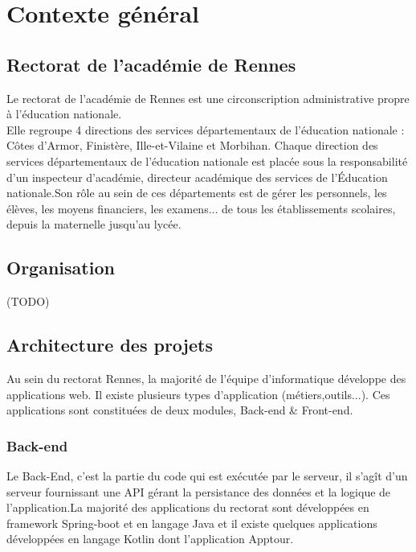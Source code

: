 \documentclass[12pt]{article}
\begin{document}
\newpage


   

\section{Contexte général}
\subsection{Rectorat de l’académie de Rennes}

Le rectorat de l'académie de Rennes est une circonscription administrative propre à l’éducation nationale.\\
Elle regroupe 4 directions des services départementaux de l'éducation nationale : 
Côtes d'Armor, Finistère, Ille-et-Vilaine et Morbihan. Chaque direction des services départementaux de l'éducation nationale est placée sous la responsabilité d'un inspecteur d'académie, directeur académique des services de l'Éducation nationale.Son rôle au sein de ces départements est de gérer les personnels, les élèves, les moyens financiers, les examens... de tous les établissements scolaires, depuis la maternelle jusqu'au lycée.

\subsection{Organisation}

(TODO)
\subsection{Architecture des projets}

Au sein du rectorat Rennes, la majorité de l'équipe d'informatique  développe des applications web. Il existe plusieurs types d'application (métiers,outils...). Ces applications sont constituées de deux modules, Back-end \&  Front-end.

\subsubsection{Back-end}

Le Back-End, c’est la partie du code qui est exécutée par le serveur, il s’agît d'un serveur fournissant une API gérant la persistance des données et la logique de l'application.La majorité des applications du rectorat sont développées en framework Spring-boot et en langage Java et il existe quelques applications développées en langage Kotlin dont l'application Apptour.
\end{document}
